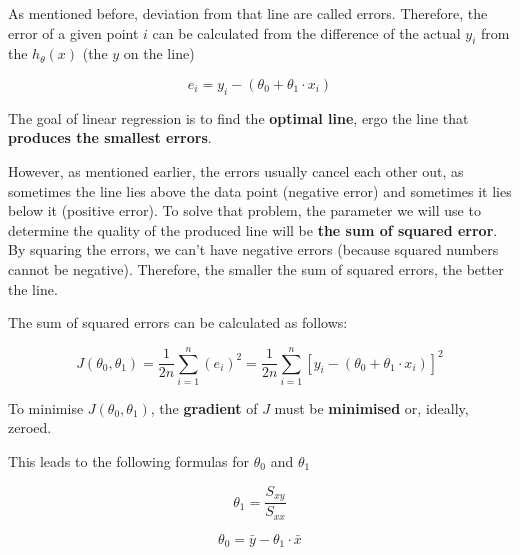 \documentclass[11pt]{article}
\begin{document}
\vspace{10px}

As mentioned before, deviation from that line are called errors. Therefore, the error of a given point $i$ can be calculated from the difference of the actual $y_{i}$ from the $h_{\theta}(x)$ (the $y$ on the line)

\begin{equation}
    e_{i} = y_{i} - (\theta^{}_{0} + \theta^{}_{1} \cdot x_{i})
\end{equation}

\vspace{10px}

The goal of linear regression is to find the \textbf{optimal line}, ergo the line that \textbf{produces the smallest errors}.

However, as mentioned earlier, the errors usually cancel each other out, as sometimes the line lies above the data point (negative error) and sometimes it lies below it (positive error). To solve that problem, the parameter we will use to determine the quality of the produced line will be \textbf{the sum of squared error}. By squaring the errors, we can't have negative errors (because squared numbers cannot be negative). Therefore, the smaller the sum of squared errors, the better the line.

The sum of squared errors can be calculated as follows:

\begin{equation}
    J(\theta^{}_{0}, \theta^{}_{1}) = \frac{1}{2n} \sum^{n}_{i=1}(e_{i})^2 = \frac{1}{2n} \sum^{n}_{i=1}[y_{i} - (\theta^{}_{0} + \theta^{}_{1} \cdot x_{i})]^2
\end{equation}

\vspace{10px}

To minimise $J(\theta^{}_{0}, \theta^{}_{1})$, the \textbf{gradient} of $J$ must be \textbf{minimised} or, ideally, zeroed.

This leads to the following formulas for $\theta^{}_{0}$ and $\theta^{}_{1}$

\begin{minipage}{0.45\textwidth}
    \begin{equation}
        \theta^{}_{1} = \frac{S_{xy}}{S_{xx}}
    \end{equation}
\end{minipage} \hfill
\begin{minipage}{0.45\textwidth}
    \begin{equation}
        \theta^{}_{0} = \bar y - \theta^{}_{1} \cdot \bar x
    \end{equation}
\end{minipage}
\end{document}
